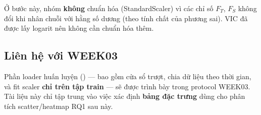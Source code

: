 Ở bước này, nhóm \textbf{không} chuẩn hóa (StandardScaler) vì các chỉ số
\(F_T\), \(F_S\) không đổi khi nhân chuỗi với hằng số dương (theo tính chất
của phương sai). VIC đã được lấy logarit nên không cần chuẩn hóa thêm.

\subsection{Liên hệ với WEEK03}

Phần loader huấn luyện () --- bao gồm cửa sổ trượt,
chia dữ liệu theo thời gian, và fit scaler \textbf{chỉ trên tập train} ---
sẽ được trình bày trong protocol WEEK03. Tài liệu này chỉ tập trung vào
việc xác định \textbf{bảng đặc trưng} dùng cho phân tích scatter/heatmap RQ1
sau này.
